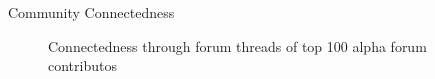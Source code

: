 \cleardoublepage
\changepapersize{305.3mm:210mm}


\begin{minipage}{147.3mm}
{
	\LARGE
	\noindent Community Connectedness \par
}
\begin{figure}[H]
	\centering
	
	\caption{Connectedness through forum threads of top 100 alpha forum contributos}
	\label{figure:year}
\end{figure}

\end{minipage}

\newpage

